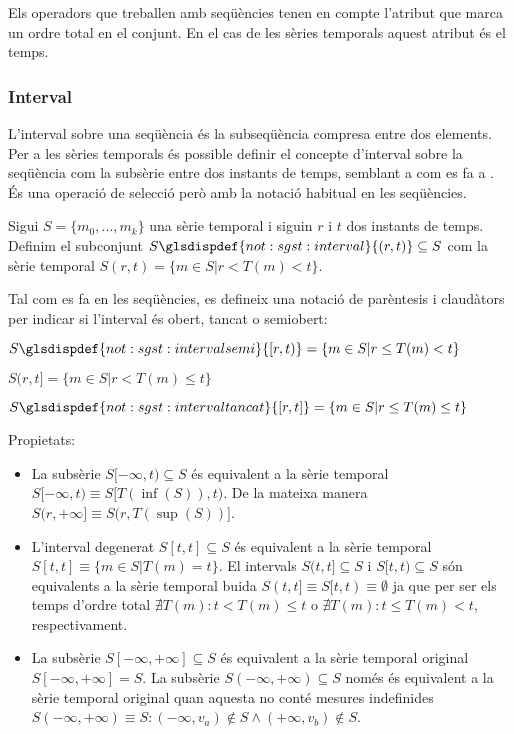 Els operadors que treballen amb seqüències tenen en compte l'atribut
que marca un ordre total en el conjunt. En el cas de les sèries
temporals aquest atribut és el temps.



\subsubsection{Interval}

L'interval sobre una seqüència és la subseqüència compresa entre dos
elements.  Per a les sèries temporals és possible definir el concepte
d'interval sobre la seqüència com la subsèrie entre dos instants de
temps, semblant a com es fa a \cite{last:keogh,last:hetland}.  És una
operació de selecció però amb la notació habitual en les seqüències.


\begin{definition}[Interval]
  \label{def:model:st-interval}
  Sigui $S=\{m_0, \ldots, m_k\}$ una sèrie temporal i siguin $r$ i $t$
  dos instants de temps. Definim el subconjunt
  $S\glsdispdef{not:sgst:interval}{(r,t)} \subseteq S$ com la sèrie
  temporal $S(r,t)=\{m\in S | r<T(m)<t\}$.

  Tal com es fa en les seqüències, es defineix una notació de
  parèntesis i claudàtors per indicar si l'interval és obert, tancat o
  semiobert:

  $S\glsdispdef{not:sgst:intervalsemi}{[r,t)}=\{m\in S  | r\leq T(m)< t\}$

  $S(r,t]=\{m\in S  | r<T(m)\leq t\}$

  $S\glsdispdef{not:sgst:intervaltancat}{[r,t]}=\{m\in S | r\leq
  T(m)\leq t\}$
\end{definition}


Propietats:
\begin{itemize}
\item La subsèrie $S[-\infty,t)\subseteq S$ és equivalent a la sèrie
  temporal $S[-\infty,t) \equiv S[T(\inf(S)),t)$. De la mateixa manera
  $S(r,+\infty] \equiv S(r,T(\sup(S))]$.

\item L'interval degenerat $S[t,t]\subseteq S$ és equivalent a la
  sèrie temporal $S[t,t] \equiv \{m\in S | T(m)=t \}$. El intervals
  $S(t,t]\subseteq S$ i $S[t,t)\subseteq S$ són equivalents a la sèrie
  temporal buida $S(t,t] \equiv S[t,t) \equiv \emptyset$ ja que per
  ser els temps d'ordre total $\nexists T(m): t < T(m) \leq t$ o
  $\nexists T(m): t \leq T(m) < t$, respectivament. 

\item La subsèrie $S[-\infty,+\infty] \subseteq S$ és equivalent a la
  sèrie temporal original $S[-\infty,+\infty] = S$. La subsèrie
  $S(-\infty,+\infty) \subseteq S$ només és equivalent a la sèrie
  temporal original quan aquesta no conté mesures indefinides
  $S(-\infty,+\infty) \equiv S: (-\infty,v_a)\notin S \wedge
  (+\infty,v_b)\notin S$.
\end{itemize}




